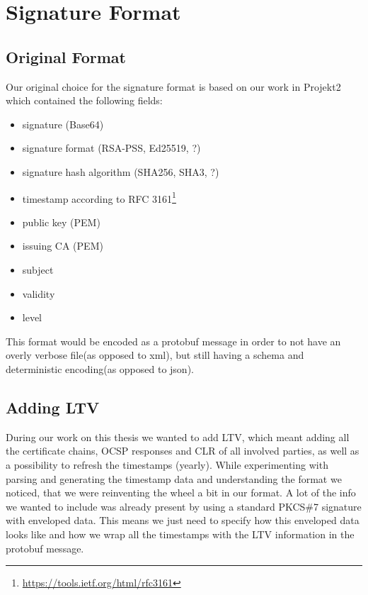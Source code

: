 \section{Signature Format}
\label{sec:signatureformat}

\subsection{Original Format}
Our original choice for the signature format is based on our work in Projekt2 which contained the following fields:

\begin{itemize}
    \item signature (Base64)
    \item signature format (\gls{RSA-PSS}, \gls{Ed25519}, ?)
    \item signature hash algorithm (\gls{SHA}256, \gls{SHA}3, ?)
    \item timestamp according to \gls{RFC} 3161\footnote{\url{https://tools.ietf.org/html/rfc3161}}
    \item public key (\gls{PEM})
    \item issuing \gls{CA} (\gls{PEM})
    \item subject
    \item validity
    \item level
\end{itemize}

This format would be encoded as a protobuf message in order to not have an overly verbose file(as opposed to xml), but still having a schema and deterministic encoding(as opposed to json).

\subsection{Adding LTV}
During our work on this thesis we wanted to add \gls{LTV}, which meant adding all the certificate chains, \gls{OCSP} responses and \gls{CLR} of all involved parties, as well as a possibility to refresh the timestamps (yearly).
While experimenting with parsing and generating the timestamp data and understanding the format we noticed, that we were reinventing the wheel a bit in our format. A lot of the info we wanted to include was already present by using a standard \gls{PKCS}\#7 signature with enveloped data.
This means we just need to specify how this enveloped data looks like and how we wrap all the timestamps with the \gls{LTV} information in the protobuf message.

